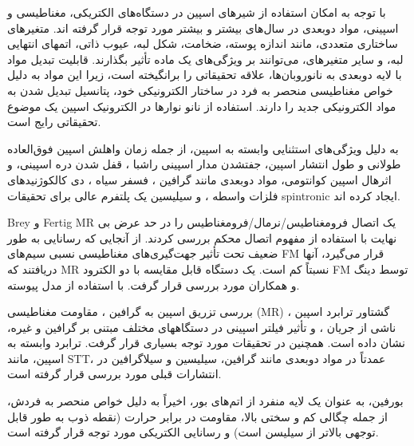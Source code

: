 با توجه به امکان استفاده از شیرهای اسپین در دستگاه‌های الکتریکی، مغناطیسی و اسپینی، مواد دوبعدی  در سال‌های بیشتر و بیشتر مورد توجه قرار گرفته اند. متغیرهای ساختاری متعددی، مانند اندازه پوسته، ضخامت، شکل لبه، عیوب ذاتی، اتمهای انتهایی لبه، و سایر متغیرهای، ‌می‌توانند بر ویژگی‌های یک ماده تأثیر بگذارند. قابلیت تبدیل مواد با لایه دوبعدی به نانوروبان‌ها، علاقه تحقیقاتی را برانگیخته است، زیرا این مواد به دلیل خواص مغناطیسی منحصر به فرد در ساختار الکترونیکی خود، پتانسیل تبدیل شدن به مواد الکترونیکی جدید را دارند. استفاده از نانو نوارها در الکترونیک اسپین یک موضوع تحقیقاتی رایج است. 

به دلیل ویژگی‌های استثنایی وابسته به اسپین، از جمله زمان واهلش اسپین فوق‌العاده طولانی و طول انتشار اسپین، جفتشدن مدار اسپینی راشبا ، قفل شدن دره اسپینی، و اثر‌هال اسپین کوانتو‌می‌، مواد دوبعدی مانند گرافین \cite{novoselovElectricFieldEffect2004}، فسفر سیاه  \cite{liuPhosphoreneUnexplored2d2014}، دی کالکوژنیدهای فلزات واسطه  \cite{wangElectronicsOptoelectronicsTwodimensional2012}، و سیلیسین \cite{guzman-verriElectronicStructureSiliconbased2007} یک پلتفرم عالی برای تحقیقات \gls{spintronic} ایجاد کرده اند.

\gls{Brey} و \gls{Fertig} \cite{breyMagnetoresistanceGraphenebasedSpin2007} \gls{MR} یک اتصال فرومغناطیس/نرمال/فرومغناطیس را در حد عرض بی نهایت با استفاده از مفهوم اتصال محکم بررسی کردند. از آنجایی که رسانایی به طور ضعیف تحت تأثیر جهت‌گیری‌های مغناطیسی نسبی سیم‌های \gls{FM} قرار ‌‌می‌‌گیرد، آنها دریافتند که \gls{MR} نسبتاً کم است. یک دستگاه قابل مقایسه با دو الکترود \gls{FM} توسط دینگ و همکاران مورد بررسی قرار گرفت. \cite{dingMagneticElectronicProperties2009} با استفاده از مدل پیوسته. 

بررسی تزریق اسپین به گرافین \cite{choSpinTransportPrecession2007, ohishiGiantMagnetoresistanceGraphene2007}، مقاومت مغناطیسی (\gls{MR}) \cite{wangQuantumTransportMassless2008}، گشتاور ترابرد اسپین ناشی از جریان  \cite{zhouMagnetotransportCurrentinducedSpin2010}، و تأثیر فیلتر اسپینی در دستگاههای مختلف مبتنی بر گرافین \cite{kangMagneticFieldDependence2011, shengElectronicTransportProperties2010} و غیره، نشان داده است. همچنین در تحقیقات مورد توجه بسیاری قرار گرفت. ترابرد وابسته به اسپین، مانند \gls{STT}، عمدتاً در مواد دوبعدی مانند گرافین، سیلیسین و سیلاگرافین در انتشارات قبلی \cite{maherSpindependentTransportSpin2022} مورد بررسی قرار گرفته است. 

‌بورفین، به عنوان یک لایه منفرد از اتم‌های بور، اخیراً به دلیل خواص منحصر به فردش، از جمله چگالی کم و سختی بالا، مقاومت در برابر حرارت (نقطه ذوب به طور قابل توجهی بالاتر از سیلیسن است) و رسانایی الکتریکی مورد توجه قرار گرفته است. 

